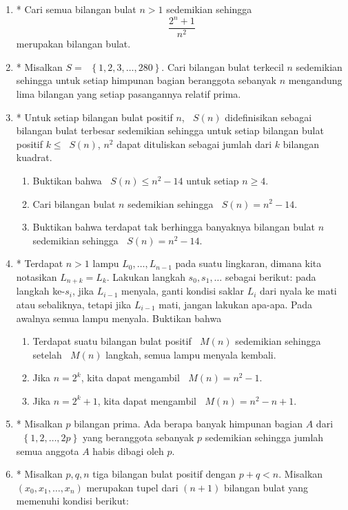 \documentclass[12pt]{article}
\newcommand*\lrbr[1]{\mathop{}\!\left\lbrace#1\right\rbrace}
\newcommand*\func[2]{\mathop{}\!{#1}{\left({#2}\right)}}
\begin{document}
\begin{enumerate}[leftmargin=*]
		\item* Cari semua bilangan bulat $ n > 1 $ sedemikian sehingga
		\[ \frac{2^{n} + 1}{n^{2}} \]
		merupakan bilangan bulat.
		\item* Misalkan $ S = \lrbr{1, 2, 3, \dots, 280} $. Cari bilangan bulat terkecil $ n $ sedemikian sehingga untuk setiap himpunan bagian beranggota sebanyak $ n $ mengandung lima bilangan yang setiap pasangannya relatif prima.
		\item* Untuk setiap bilangan bulat positif $ n $, $ \func{S}{n} $ didefinisikan sebagai bilangan bulat terbesar sedemikian sehingga untuk setiap bilangan bulat positif $ k \leq \func{S}{n} $, $ n^{2} $ dapat dituliskan sebagai jumlah dari $ k $ bilangan kuadrat.
		\begin{enumerate}
			\item Buktikan bahwa $ \func{S}{n} \leq n^{2} - 14 $ untuk setiap $ n \geq 4 $.
			\item Cari bilangan bulat $ n $ sedemikian sehingga $ \func{S}{n} = n^{2} - 14 $.
			\item Buktikan bahwa terdapat tak berhingga banyaknya bilangan bulat $ n $ sedemikian sehingga $ \func{S}{n} = n^{2} - 14 $.
		\end{enumerate}
		\item* Terdapat $ n > 1 $ lampu $ L_{0}, \dots, L_{n - 1} $ pada suatu lingkaran, dimana kita notasikan $ L_{n + k} = L_{k} $. Lakukan langkah $ s_{0}, s_{1}, \dots $ sebagai berikut: pada langkah ke-$ s_{i} $, jika $ L_{i - 1} $ menyala, ganti kondisi saklar $ L_{i} $ dari nyala ke mati atau sebaliknya, tetapi jika $ L_{i - 1} $ mati, jangan lakukan apa-apa. Pada awalnya semua lampu menyala. Buktikan bahwa
		\begin{enumerate}
			\item Terdapat suatu bilangan bulat positif $ \func{M}{n} $ sedemikian sehingga setelah $ \func{M}{n} $ langkah, semua lampu menyala kembali.
			\item Jika $ n = 2^{k} $, kita dapat mengambil $ \func{M}{n} = n^{2} - 1 $.
			\item Jika $ n = 2^{k} + 1 $, kita dapat mengambil $ \func{M}{n} = n^{2} - n + 1 $.
		\end{enumerate}
		\item* Misalkan $ p $ bilangan prima. Ada berapa banyak himpunan bagian $ A $ dari $ \lrbr{1, 2, \dots, 2p} $ yang beranggota sebanyak $ p $ sedemikian sehingga jumlah semua anggota $ A $ habis dibagi oleh $ p $.
		\item* Misalkan $ p, q, n $ tiga bilangan bulat positif dengan $ p + q < n $. Misalkan $ \left(x_{0}, x_{1}, \dots, x_{n}\right) $ merupakan tupel dari $ \left(n + 1\right) $ bilangan bulat yang memenuhi kondisi berikut:

\end{enumerate}
\end{document}
